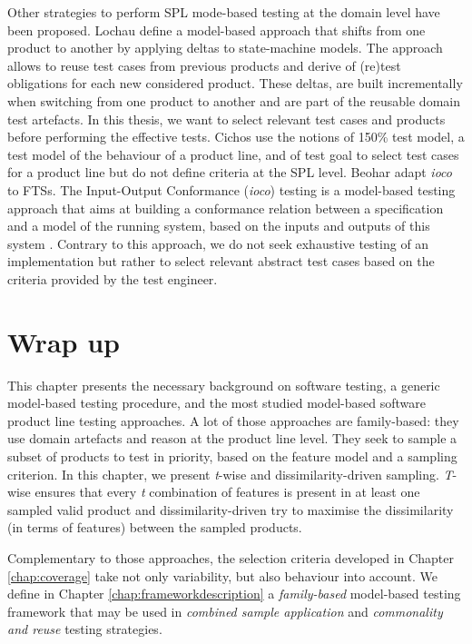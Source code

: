 Other strategies to  perform SPL mode-based testing at the domain level have been proposed. Lochau \etal \cite{Lochau2012,Lochau2014} define a model-based approach that shifts from one product to another by applying deltas to state-machine models. The approach allows to reuse test cases from previous products and derive of (re)test obligations for each new considered product. These deltas, are built incrementally when switching from one product to another and are part of the reusable domain test artefacts. In this thesis, we want to select relevant test cases and products before performing the effective tests.
%
Cichos \etal \cite{Cichos2011} use the notions of 150\% test model, \ie a test model of the behaviour of a product line, and of test goal to select test cases for a product line but do not define criteria at the SPL level. 
%
Beohar \etal \cite{Beohar2014a} adapt \textit{ioco} \cite{Tretmans2008} to \glspl{FTS}. The Input-Output Conformance (\textit{ioco}) testing is a model-based testing approach that aims at building a conformance relation between a specification and a model of the running system, based on the inputs and outputs of this system \cite{Tretmans2011,Tretmans2008}. Contrary to this approach, we do not seek exhaustive testing of an implementation but rather to select relevant abstract test cases based on the criteria provided by the test engineer.


\section{Wrap up}

This chapter presents the necessary background on software testing, a generic model-based testing procedure, and the most studied model-based software product line testing approaches. A lot of those approaches are family-based: they use domain artefacts and reason at the product line level. They seek to sample a subset of products to test in priority, based on the feature model and a sampling  criterion. In this chapter, we present \textit{t}-wise and dissimilarity-driven sampling. \textit{T}-wise ensures that every \textit{t} combination of features is present in at least one sampled valid product and dissimilarity-driven try to maximise the dissimilarity (in terms of features) between the sampled products. 

Complementary to those approaches, the selection criteria developed in Chapter \ref{chap:coverage} take not only variability, but also behaviour into account. We define in Chapter \ref{chap:frameworkdescription} a \emph{family-based} model-based testing framework that may be used in \emph{combined \textit{sample application}} and \emph{\textit{commonality and reuse}} testing strategies.

